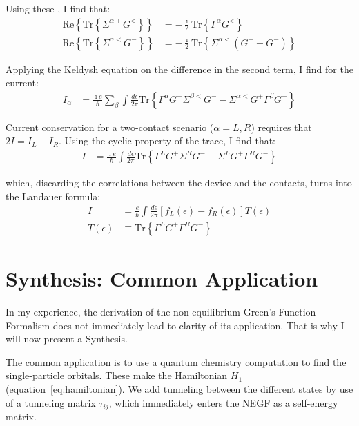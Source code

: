 Using these , I find that:
\begin{align*}
\text{Re}\left\{\text{Tr}\left\{ \Sigma^{\alpha+} G^<\right\}\right\} &= - \frac{\imath}{2} \text{Tr}\left\{ \Gamma^\alpha G^< \right\} \\
\text{Re}\left\{\text{Tr}\left\{ \Sigma^{\alpha<} G^-\right\}\right\} &= - \frac{\imath}{2} \text{Tr}\left\{\Sigma^{\alpha<} \left(G^+ - G^-\right)\right\}
\end{align*}

Applying the Keldysh equation on the difference in the second term, I find for the current:
\begin{align*}
I_\alpha &= \frac{\imath e}{\hbar} \sum_\beta \int \frac{d\epsilon}{2\pi} \text{Tr}\left\{ \Gamma^\alpha G^+ \Sigma^{\beta <}G^- - \Sigma^{\alpha<}G^+\Gamma^\beta G^- \right\}
\end{align*}

Current conservation for a two-contact scenario ($\alpha=L,R$) requires that $2 I = I_L - I_R$. Using the cyclic property of the trace, I find that:
\begin{align*}
I &= \frac{\imath e}{\hbar} \int \frac{d\epsilon}{2\pi} \text{Tr}\left\{ \Gamma^L G^+ \Sigma^R G^- - \Sigma^L G^+ \Gamma^R G^-\right\}
\end{align*}

which, discarding the correlations between the device and the contacts, turns into the Landauer formula:
\begin{align}
I &= \frac{e}{\hbar} \int \frac{d\epsilon}{2\pi} \left[ f_L(\epsilon) - f_R(\epsilon)\right] T(\epsilon) \label{eq:landauer}\\
T(\epsilon)&\equiv \text{Tr}\left\{ \Gamma^L G^+ \Gamma^R G^-\right\}
\end{align}

\section{Synthesis: Common Application}
\label{sec:synthesis}


In my experience, the derivation of the non-equilibrium Green's Function Formalism does not immediately lead to clarity of its application. That is why I will now present a Synthesis.

The common application is to use a quantum chemistry computation to find the single-particle orbitals. These make the Hamiltonian $H_1$ (equation~\ref{eq:hamiltonian}). We add tunneling between the different states by use of a tunneling matrix $\tau_{ij}$, which immediately enters the NEGF as a self-energy matrix. 

